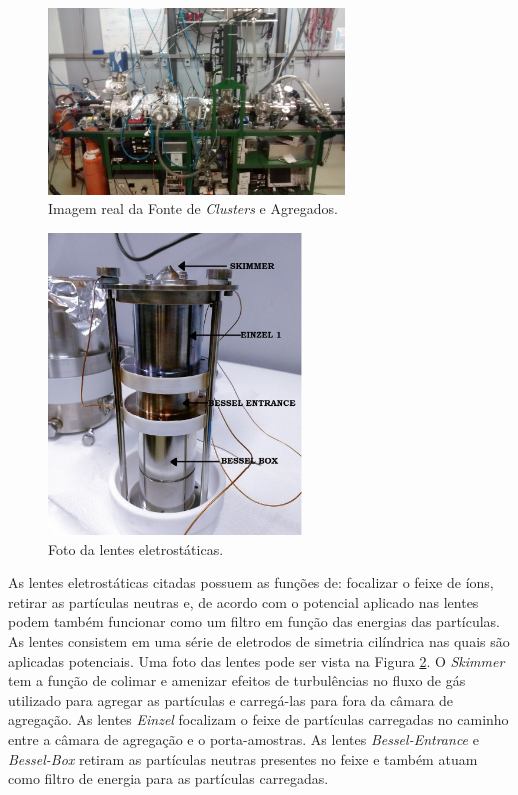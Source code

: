 \begin{figure}
  \centering
  \includegraphics[width=0.7\textwidth]{images/foca/foto_foca}
  \caption{ Imagem real da  Fonte de \textit{Clusters} e Agregados.  }
  \label{fig:foto_foca}
\end{figure}

\begin{figure}
  \centering
  \includegraphics[width=0.6\textwidth]{images/foca/lentes}
  \caption{ Foto da lentes eletrostáticas.  }
  \label{fig:foto_lentes}
\end{figure}

As lentes eletrostáticas citadas possuem as funções de: focalizar o feixe de íons, retirar as partículas neutras e, de acordo com o potencial aplicado nas lentes podem também funcionar como um filtro em função das energias das partículas. As lentes consistem em uma série de eletrodos de simetria cilíndrica nas quais são aplicadas potenciais. Uma foto das lentes pode ser vista na Figura \ref{fig:foto_lentes}.
O \textit{Skimmer} tem a função de colimar e amenizar efeitos de turbulências no fluxo de gás utilizado para agregar as partículas e carregá-las para fora da câmara de agregação. As lentes \textit{Einzel}  focalizam o feixe de partículas carregadas no caminho entre a câmara de agregação e o porta-amostras. As lentes \textit{Bessel-Entrance} e \textit{Bessel-Box} retiram as partículas neutras presentes no feixe e também
atuam como filtro de energia para as partículas carregadas. 

